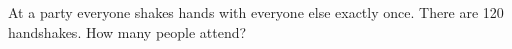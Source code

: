 At a party everyone shakes hands with everyone else exactly once. There are 120 handshakes. How many people attend?
